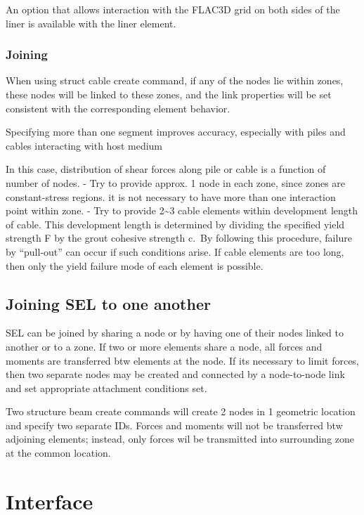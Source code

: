 \documentclass[a4paper, nobind]{templates/ociamthesis}
\begin{document}
An option that allows interaction with the FLAC3D grid on both sides of
the liner is available with the liner element.

\hypertarget{joining}{%
\subsubsection{Joining}\label{joining}}

When using struct cable create command, if any of the nodes lie within
zones, these nodes will be linked to these zones, and the link
properties will be set consistent with the corresponding element
behavior.

Specifying more than one segment improves accuracy, especially with
piles and cables interacting with host medium

In this case, distribution of shear forces along pile or cable is a
function of number of nodes. - Try to provide approx. 1 node in each
zone, since zones are constant-stress regions. it is not necessary to
have more than one interaction point within zone. - Try to provide 2\textasciitilde3
cable elements within development length of cable. This development
length is determined by dividing the specified yield strength F by the
grout cohesive strength c.~By following this procedure, failure by
``pull-out'' can occur if such conditions arise. If cable elements are too
long, then only the yield failure mode of each element is possible.

\hypertarget{joining-sel-to-one-another}{%
\subsection{Joining SEL to one another}\label{joining-sel-to-one-another}}

SEL can be joined by sharing a node or by having one of their nodes
linked to another or to a zone. If two or more elements share a node,
all forces and moments are transferred btw elements at the node. If its
necessary to limit forces, then two separate nodes may be created and
connected by a node-to-node link and set appropriate attachment
conditions set.

Two structure beam create commands will create 2 nodes in 1 geometric
location and specify two separate IDs. Forces and moments will not be
transferred btw adjoining elements; instead, only forces wil be
transmitted into surrounding zone at the common location.

\hypertarget{interface-2}{%
\section{Interface}\label{interface-2}}
\end{document}

